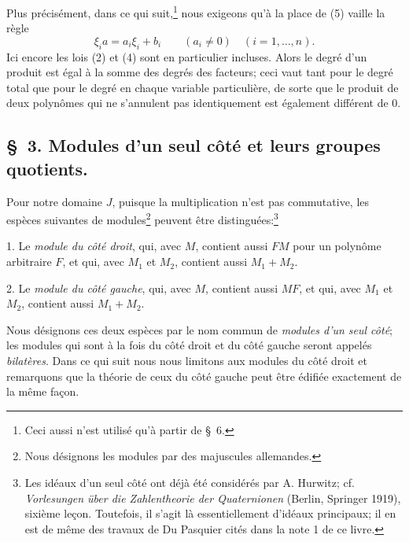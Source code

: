 Plus précisément, dans ce qui suit,\footnote{Ceci aussi n'est utilisé qu'à partir de \S~6.} nous exigeons qu'à la place de (5) vaille la règle
\begin{equation}
 \xi_i a=a_i\xi_i+b_i\qquad (a_i\ne0)\quad(i=1,\ldots,n).
\tag{6}
\end{equation}
Ici encore les lois (2) et (4) sont en particulier incluses. Alors le degré d'un produit est égal à la somme des degrés des facteurs; ceci vaut tant pour le degré total que pour le degré en chaque variable particulière, de sorte que le produit de deux polynômes qui ne s'annulent pas identiquement est également différent de 0.

\subsection*{\S~3. Modules d'un seul côté et leurs groupes quotients.}

Pour notre domaine $J$, puisque la multiplication n'est pas commutative, les espèces suivantes de modules\footnote{Nous désignons les modules par des majuscules allemandes.} peuvent être distinguées:\footnote{Les idéaux d'un seul côté ont déjà été considérés par A. Hurwitz; cf. \emph{Vorlesungen über die Zahlentheorie der Quaternionen} (Berlin, Springer 1919), sixième leçon. Toutefois, il s'agit là essentiellement d'idéaux principaux; il en est de même des travaux de Du Pasquier cités dans la note 1 de ce livre.}

1. Le \emph{module du côté droit}, qui, avec $M$, contient aussi $FM$ pour un polynôme arbitraire $F$, et qui, avec $M_1$ et $M_2$, contient aussi $M_1+M_2$.

2. Le \emph{module du côté gauche}, qui, avec $M$, contient aussi $MF$, et qui, avec $M_1$ et $M_2$, contient aussi $M_1+M_2$.

Nous désignons ces deux espèces par le nom commun de \emph{modules d'un seul côté}; les modules qui sont à la fois du côté droit et du côté gauche seront appelés \emph{bilatères}. Dans ce qui suit nous nous limitons aux modules du côté droit et remarquons que la théorie de ceux du côté gauche peut être édifiée exactement de la même façon.

